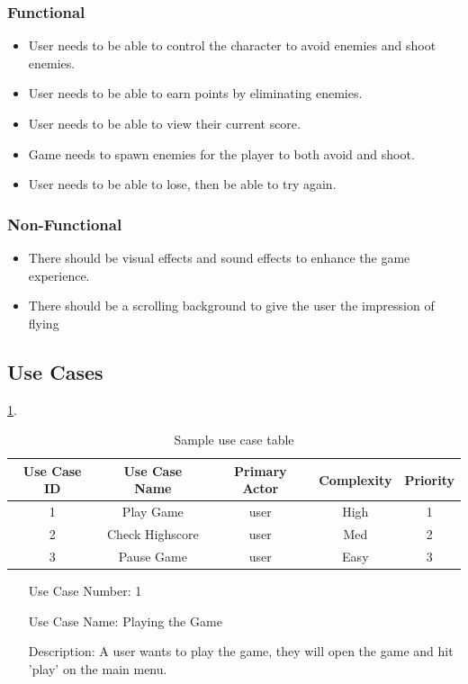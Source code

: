 \documentclass[10pt,conference,onecolumn,compsoc]{IEEEtran}
\begin{document}
\subsubsection{Functional}
\begin{itemize}
\item User needs to be able to control the character to avoid enemies and shoot enemies.
\item User needs to be able to earn points by eliminating enemies.
\item User needs to be able to view their current score.
\item Game needs to spawn enemies for the player to both avoid and shoot.
\item User needs to be able to lose, then be able to try again.
\end{itemize}

\subsubsection{Non-Functional}
\begin{itemize}
\item There should be visual effects and sound effects to enhance the game experience.
\item There should be a scrolling background to give the user the impression of flying

\end{itemize}

\subsection{Use Cases}
 \ref{tab:useCaseIndex}.




\begin{table}
\centering
\begin{tabular}{|c|c|c|c|c|}
\hline
Use Case ID & Use Case Name & Primary Actor & Complexity & Priority \\
\hline \hline
1 & Play Game & user & High & 1\\
\hline
2 & Check Highscore & user & Med & 2\\
\hline
3 & Pause Game & user & Easy & 3\\
\hline
\end{tabular}
\caption{Sample use case table}
\label{tab:useCaseIndex}
\end{table}


\begin{itemize}
\item[Use Case Number:] 1
\item[Use Case Name:] Playing the Game
\item[Description:] A user wants to play the game, they will open the game and hit 'play' on the main menu.
\end{itemize}
\end{document}
